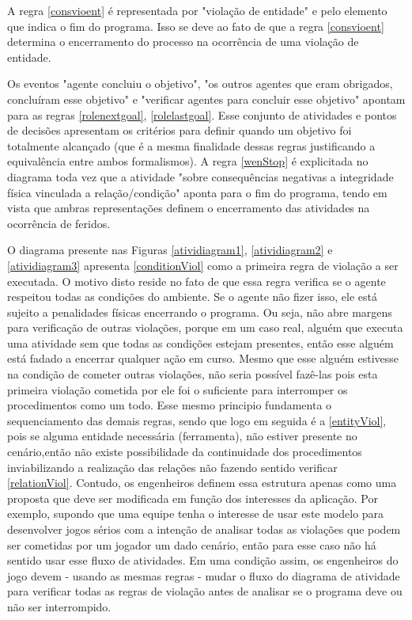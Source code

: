 A regra \ref{consvioent} é representada por "violação de entidade" e pelo elemento que indica o fim do programa. Isso se deve ao fato de que a regra \ref{consvioent} determina o encerramento do processo na ocorrência de uma violação de entidade. 

Os eventos "agente concluiu o objetivo", "os outros agentes que eram obrigados, concluíram esse objetivo" e "verificar agentes para concluir esse objetivo" apontam para as regras \ref{rolenextgoal}, \ref{rolelastgoal}. Esse conjunto de atividades e pontos de decisões apresentam os critérios para definir quando um objetivo foi totalmente alcançado (que é a mesma finalidade dessas regras justificando a equivalência entre ambos formalismos).  A regra \ref{wenStop} é explicitada no diagrama toda vez que a atividade "sobre consequências negativas a integridade física vinculada  a relação/condição" aponta para o fim do programa, tendo em vista que ambras representações definem o encerramento das atividades na ocorrência de feridos. 

O diagrama presente nas Figuras \ref{atividiagram1}, \ref{atividiagram2} e \ref{atividiagram3} apresenta \ref{conditionViol} como a primeira regra de violação a ser executada. O motivo disto reside no fato de que essa regra verifica se o agente respeitou todas as condições do ambiente. Se o agente não fizer isso, ele está sujeito a penalidades físicas encerrando o programa. Ou seja, não abre margens para verificação de outras violações, porque em um caso real, alguém que executa uma atividade sem que todas as condições estejam presentes, então esse alguém está fadado a encerrar qualquer ação em curso. Mesmo que esse alguém estivesse na condição de cometer outras violações, não seria possível fazê-las pois esta primeira violação cometida por ele foi o suficiente para interromper os procedimentos como um todo. Esse mesmo principio fundamenta o sequenciamento das demais regras, sendo que logo em seguida é a \ref{entityViol}, pois se alguma entidade  necessária (ferramenta), não estiver presente no cenário,então não existe possibilidade da continuidade dos procedimentos inviabilizando a realização das relações não fazendo sentido verificar \ref{relationViol}. Contudo, os engenheiros definem essa estrutura apenas como uma proposta que deve ser modificada em função dos interesses da aplicação. Por exemplo, supondo que uma equipe tenha o interesse de usar este modelo para desenvolver jogos sérios com a intenção de analisar todas as violações que podem ser cometidas por um jogador um dado cenário, então para esse caso não há sentido usar esse fluxo de atividades. Em uma condição assim, os engenheiros do jogo devem - usando as mesmas regras - mudar o fluxo do diagrama de atividade para verificar todas as regras de violação antes de analisar se o programa deve ou não ser interrompido.